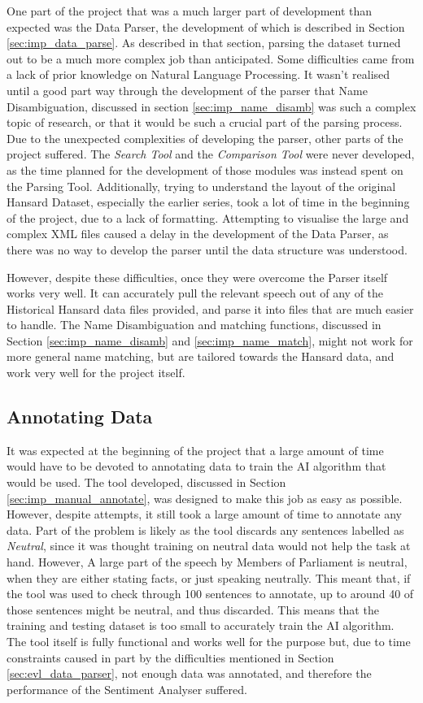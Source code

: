 One part of the project that was a much larger part of development than expected was the Data Parser, the development of which is described in Section \ref{sec:imp_data_parse}. As described in that section, parsing the dataset turned out to be a much more complex job than anticipated. Some difficulties came from a lack of prior knowledge on Natural Language Processing. It wasn't realised until a good part way through the development of the parser that Name Disambiguation, discussed in section \ref{sec:imp_name_disamb} was such a complex topic of research, or that it would be such a crucial part of the parsing process. Due to the unexpected complexities of developing the parser, other parts of the project suffered. The \emph{Search Tool} and the \emph{Comparison Tool} were never developed, as the time planned for the development of those modules was instead spent on the Parsing Tool. Additionally, trying to understand the layout of the original Hansard Dataset, especially the earlier series, took a lot of time in the beginning of the project, due to a lack of formatting. Attempting to visualise the large and complex XML files caused a delay in the development of the Data Parser, as there was no way to develop the parser until the data structure was understood.

However, despite these difficulties, once they were overcome the Parser itself works very well. It can accurately pull the relevant speech out of any of the Historical Hansard data files provided, and parse it into files that are much easier to handle. The Name Disambiguation and matching functions, discussed in Section \ref{sec:imp_name_disamb} and \ref{sec:imp_name_match}, might not work for more general name matching, but are tailored towards the Hansard data, and work very well for the project itself.

\subsection{Annotating Data}
\label{sec:evl_annotate_data}

It was expected at the beginning of the project that a large amount of time would have to be devoted to annotating data to train the AI algorithm that would be used. The tool developed, discussed in Section \ref{sec:imp_manual_annotate}, was designed to make this job as easy as possible. However, despite attempts, it still took a large amount of time to annotate any data. Part of the problem is likely as the tool discards any sentences labelled as \emph{Neutral}, since it was thought training on neutral data would not help the task at hand. However, A large part of the speech by Members of Parliament is neutral, when they are either stating facts, or just speaking neutrally. This meant that, if the tool was used to check through 100 sentences to annotate, up to around 40 of those sentences might be neutral, and thus discarded. This means that the training and testing dataset is too small to accurately train the AI algorithm. The tool itself is fully functional and works well for the purpose but, due to time constraints caused in part by the difficulties mentioned in Section \ref{sec:evl_data_parser}, not enough data was annotated, and therefore the performance of the Sentiment Analyser suffered.

